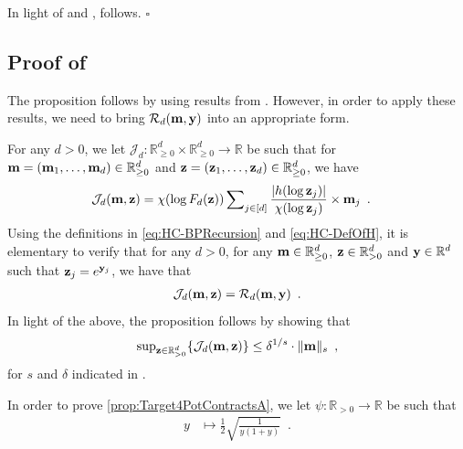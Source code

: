 \documentclass[11pt,reqno]{amsart}
\numberwithin{equation}{section}
\newcommand{\cJ}{{\mathcal{J}}}
\newcommand{\cR}{{\mathcal{R}}}
\newcommand{\blue}[1]{{\color{blue}#1}}
\newcommand{\cadmiumgreen}[1]{{\color{cadmiumgreen}#1}}
\newcommand{\darkmagenta}[1]{{\color{darkmagenta}#1}}
\newcommand{\goldenbrown}[1]{{\color{goldenbrown}#1}}
\newcommand{\dpotF}{{\psi}}
\newcommand{\xdpotF}{\chi}
\newcommand{\pfs}{\darkmagenta{s}}
\newcommand{\trecur}{F}
\newcommand{\dlogtrecur}{h}
\newcommand{\norm}[2]{\goldenbrown{\|} #1 \goldenbrown{\|}_{#2}}
\newcommand{\abs}[1]{\blue{|}#1\blue{|}}
\renewcommand{\blue}[1]{#1}
\renewcommand{\cadmiumgreen}[1]{#1}
\renewcommand{\darkmagenta}[1]{#1}
\renewcommand{\goldenbrown}[1]{#1}
\newcommand{\kz}{\cadmiumgreen{z}}
\renewcommand{\kz}{z}
\begin{document}
%
In light of  and ,  follows. 
 \hfill $\square$

\newcommand{\HCFactor}{{\Xi}}

\subsection{Proof of }\label{sec:prop:PotContracts}

The proposition follows by using results from \cite{ConnectiveConst}. However, in order to apply these results, we need
to bring $\cR_{d}({\bf m}, {\bf y})$ into an appropriate form. 




For any $d>0$, we let $\cJ_{d}:\mathbb{R}^d_{\geq 0}\times \mathbb{R}^d_{\geq 0}\to \mathbb{R}$ be such that 
for ${\bf m}=({\bf m}_1, \ldots, {\bf m}_d)\in \mathbb{R}^{d}_{\geq 0}$ and ${\bf \kz}=({\bf \kz}_1,\ldots, {\bf \kz}_d) \in \mathbb{R}^{d}_{\geq 0}$, we have
{\small 
\begin{align}
\cJ_{d}({\bf m}, {\bf \kz}) &= \xdpotF(\log \trecur_{d}({\bf \kz}) ) \sum\nolimits_{j\in [d]}
\frac{\abs{ \dlogtrecur(\log {\bf \kz}_j )}}{ \xdpotF( \log {\bf \kz}_j )} 
\times {\bf m}_j \enspace. \nonumber
\end{align}
}
Using the definitions in \eqref{eq:HC-BPRecursion} and \eqref{eq:HC-DefOfH}, it is elementary to verify that for any $d>0$, for any 
${\bf m}\in \mathbb{R}^d_{\geq 0}$, ${\bf z}\in \mathbb{R}^d_{>0}$ and ${\bf y}\in \mathbb{R}^{d}$ such that ${\bf z}_j=e^{{\bf y}_j}$,
we have that
\begin{align}\nonumber
\cJ_{d}({\bf m}, {\bf z})= \cR_{d}({\bf m}, {\bf y}) \enspace.
\end{align}
In light of the above, the proposition follows by showing that 
\begin{align}\label{prop:Target4PotContractsA}
\sup\nolimits_{{\bf z}\in \mathbb{R}^d_{>0}} \{ \cJ_{d}({\bf m}, {\bf z}) \} \leq \delta^{{1}/{\pfs}} \cdot \norm{ {\bf m}}{\pfs} \enspace,
\end{align}
for $\pfs$ and $\delta$ indicated in . 

%
%
In order to prove \eqref{prop:Target4PotContractsA}, we let $\dpotF: \mathbb{R}_{>0}\to \mathbb{R}$ be such that
{\small 
\begin{align}\label{def:PotentialFunction}
 y& \mapsto \frac12\sqrt{\frac{1}{y(1+y)}} \enspace.
\end{align}
}
\end{document}
